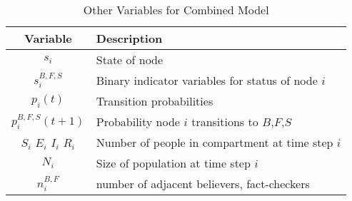 \documentclass[conference]{IEEEtran}
\begin{document}
%
\begin{table}[!t]
\renewcommand{\arraystretch}{1.3}
\caption{Other Variables for Combined Model}
\label{tbl:params}
\begin{tabular}{|c l|}
\hline
Variable & Description\\
\hline
$s_{i}$ & State of node\\
\hline
$s_{i}^{B, F, S}$ & Binary indicator variables for status of node $i$\\
\hline
$p_{i}(t)$ & Transition probabilities\\
\hline
$p_{i}^{B, F, S}(t+1)$ & Probability node $i$ transitions to $B$,$F$,$S$\\
\hline
$S_i$ $E_i$ $I_i$ $R_i$ & Number of people in compartment at time step $i$\\
\hline
$N_i$ & Size of population at time step $i$\\
\hline
$n_{i}^{B,F}$ & number of adjacent believers, fact-checkers\\
\hline
\end{tabular}
\end{table}
\end{document}
